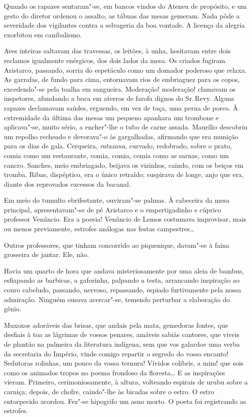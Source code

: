 Quando os rapazes sentaram"-se, em bancos vindos do Ateneu
de propósito, e um gesto do diretor ordenou o assalto, as tábuas das
mesas gemeram. Nada pôde a severidade dos vigilantes contra a
selvageria da boa vontade. A licença da alegria exorbitou em
canibalismo. 

Aves inteiras saltavam das travessas, os leitões, à unha,
hesitavam entre dois reclamos igualmente enérgicos, dos dois lados da
mesa. Os criados fugiram. Aristarco, passando, sorria do espetáculo
como um domador poderoso que relaxa. As garrafas, de fundo para cima,
entornavam rios de embriaguez para os copos, excedendo"-se pela toalha
em sangueira. Moderação! moderação! clamavam os inspetores, afundando a
boca em aterros de farofa dignos do Sr.\,Revy. Alguns rapazes declamavam
saúdes, erguendo, em vez de taça, uma perna de porco. À extremidade da
última das mesas um pequeno apanhara um trombone e aplicava"-se, muito
sério, a encher"-lhe o tubo de carne assada. Maurílio descobriu um
repolho recheado e devorava"-o às gargalhadas, afirmando que era
munição para os dias de gala. Cerqueira, \textit{ratazana}, curvado, redobrado,
sobre o prato, comia como um restaurante, comia, comia, comia como as
sarnas, como um cancro. Sanches, meio embriagado, beijava os vizinhos,
caindo, com os beiços em tromba. Ribas, dispéptico, era o único
retraído; suspirava de longe, anjo que era, diante dos reprovados
excessos da bacanal. 

Em meio do tumulto ebrifestante, ouviram"-se
palmas. À cabeceira da mesa principal, apresentavam"-se de pé Aristarco e
o empertigadinho e cúprico professor Venâncio. Era a poesia! Venâncio
de Lemos costumava improvisar, mais ou menos previamente, estrofes
análogas nas festas campestres\ldots{} 

Outros professores, que tinham concorrido ao piquenique, 
davam"-se à faina grosseira de jantar. Ele, não. 

Havia um quarto de hora que andava misteriosamente por uma aleia
de bambus, esfiapando as barbicas, a gaforinha, palpando a testa,
arrancando inspiração ao couro cabeludo, passando, nervoso, repassando,
espiado furtivamente pela nossa admiração. Ninguém ousava acercar"-se,
temendo perturbar a elaboração do gênio. 

Muxoxos adoráveis das brisas,
que andais pela mata, gemedoras fontes, que desfiais à toa as lágrimas
de vossos penares, amáveis sabiás cantores, que viveis de plantão na
palmeira da literatura indígena, sem que vos galardoe uma verba da
secretaria do Império, vinde comigo repartir o segredo do vosso
encanto! Sedutoras rolinhas, um pouco da vossa ternura! Vívidos
colibris, a mim! que sois como os animados tropos no poema frondoso da
floresta\ldots{} E as inspirações vieram. Primeiro, cerimoniosamente, à
altura, volteando espirais de urubu sobre a carniça; depois, de chofre,
caindo"-lhe às bicadas sobre o estro. O estro entorpecido acordou.
Fez"-se hipogrifo um asno morto. O poeta foi registrando as estrofes.

